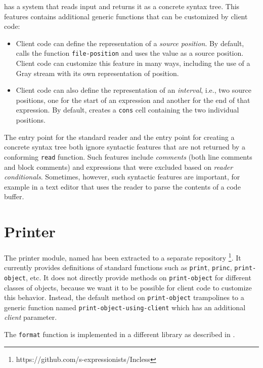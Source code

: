 \eclector{} has a system that reads input and returns it as a concrete
syntax tree.  This features contains additional generic functions that
can be customized by client code:

\begin{itemize}
\item Client code can define the representation of a \emph{source
  position}.  By default, \eclector{} calls the function
  \texttt{file-position} and uses the value as a source position.
  Client code can customize this feature in many ways, including the
  use of a Gray stream with its own representation of position.
\item Client code can also define the representation of an
  \emph{interval}, i.e., two source positions, one for the start of an
  expression and another for the end of that expression.  By default,
  \eclector{} creates a \texttt{cons} cell containing the two
  individual positions.
\end{itemize}

The entry point for the standard reader and the entry point for
creating a concrete syntax tree both ignore syntactic features that
are not returned by a conforming \texttt{read} function.  Such
features include \emph{comments} (both line comments and block
comments) and expressions that were excluded based on \emph{reader
  conditionals}.  Sometimes, however, such syntactic features are
important, for example in a text editor that uses the reader to parse
the contents of a \commonlisp{} code buffer.

\section{Printer}
\label{sec-printer}

The printer module, named \incless{} has been extracted to a separate
repository%
\footnote{https://github.com/s-expressionists/Incless}.
It currently provides definitions of standard functions such as
\texttt{print}, \texttt{princ}, \texttt{print-object}, etc.  It does
not directly provide methods on \texttt{print-object} for different
classes of objects, because we want it to be possible for client code
to customize this behavior.  Instead, the default method on
\texttt{print-object} trampolines to a generic function named
\texttt{print-object-using-client} which has an additional
\emph{client} parameter.

The \texttt{format} function is implemented in a different library as
described in .


